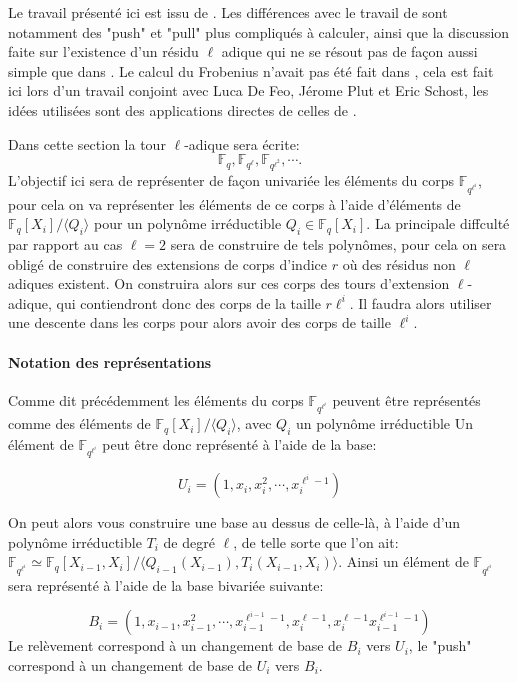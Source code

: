 \documentclass[10pt,a4paper]{book}
\theoremstyle{plain}
\theoremstyle{definition}
\theoremstyle{definition}
\theoremstyle{definition}
\theoremstyle{definition}
\theoremstyle{remark}
\theoremstyle{remark}
\begin{document}
Le travail présenté ici est issu de \cite{DeFeo-Doliskani-Schost13}. Les différences avec le travail de \cite{Doliskani-Schost15} sont notamment des "push" et "pull" plus compliqués à calculer, ainsi que la discussion faite sur l'existence d'un résidu $\ell$ adique qui ne se résout pas de façon aussi simple que dans \cite{Doliskani-Schost15}. Le calcul du Frobenius n'avait pas été fait dans \cite{DeFeo-Doliskani-Schost13}, cela est fait ici lors d'un travail conjoint avec Luca De Feo, Jérome Plut et Eric Schost, les idées utilisées sont des applications directes de celles de \cite{Doliskani-Schost15}.

Dans cette section la tour $\ell$-adique sera écrite:
\[
\mathbb{F}_q, \mathbb{F}_{q^\ell}, \mathbb{F}_{q^{\ell^2}}, \cdots.
\]
L'objectif ici sera de représenter de façon univariée les éléments du corps $\mathbb{F}_{q^{\ell^i}}$, pour cela on va représenter les éléments de ce corps à l'aide d'éléments de $\mathbb{F}_{q}[X_i]/\langle Q_i \rangle$ pour un polynôme irréductible $Q_i \in \mathbb{F}_q[X_i]$. La principale diffculté par rapport au cas $\ell=2$ sera de construire de tels polynômes, pour cela on sera obligé de construire des extensions de corps d'indice $r$ où des résidus non $\ell$ adiques existent. On construira alors sur ces corps des tours d'extension $\ell$-adique, qui contiendront donc des corps de la taille $r\ell^i$. Il faudra alors utiliser une descente dans les corps pour alors avoir des corps de taille $\ell^i$.

\paragraph{Notation des représentations}
Comme dit précédemment les éléments du corps $\mathbb{F}_{q^{\ell^i}}$ peuvent être représentés comme des éléments de $\mathbb{F}_q[X_i]/\langle Q_i \rangle $, avec $Q_i$ un polynôme irréductible Un élément de $\mathbb{F}_{q^{\ell^i}}$ peut être donc représenté à l'aide de la base:

\[
U_i=(1,x_i,x_i^2,\cdots,x_i^{\ell^i-1})
\]

On peut alors vous construire une base au dessus de celle-là, à l'aide d'un polynôme irréductible $T_{i}$ de degré $\ell$, de telle sorte que l'on ait: $\mathbb{F}_{q^{\ell^{i}}}\simeq \mathbb{F}_q[X_{i-1},X_{i}]/\langle Q_{i-1}(X_{i-1}), T_i(X_{i-1},X_{i}) \rangle $. Ainsi un élément de $\mathbb{F}_{q^{\ell^{i}}}$ sera représenté à l'aide de la base bivariée suivante:

\[
B_i=(1,x_{i-1},x_{i-1}^2,\cdots,x_{i-1}^{\ell^{i-1}-1},x_i^{\ell-1},x_i^{\ell-1}x_{i-1}^{\ell^{i-1}-1})
\] 
Le relèvement correspond à un changement de base de $B_i$ vers $U_i$, le "push" correspond à un changement de base de $U_i$ vers $B_i$.
\end{document}
